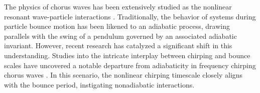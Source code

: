 The physics of chorus waves has been extensively studied as the nonlinear resonant wave-particle interactions 
 \cite{omura_theory_2008, an2019, nunn_numerical_1990,tao_theoretical_2020,sudan_theory_1971,vomvoridis_nonlinear_1980,dawson1983,zheng2024,zonca_theoretical_2021}. %
Traditionally, the behavior of systems during particle bounce motion has been likened to an adiabatic process, drawing parallels with the  swing of a pendulum governed by an associated adiabatic invariant. However, recent research has catalyzed a significant shift in this understanding. 
Studies into the intricate interplay between chirping and bounce scales have uncovered a notable departure from adiabaticity in frequency chirping chorus waves
 \cite{tao2017a,tao2017b}. In this scenario, the nonlinear chirping timescale closely aligns with the bounce period, instigating nonadiabatic interactions.
